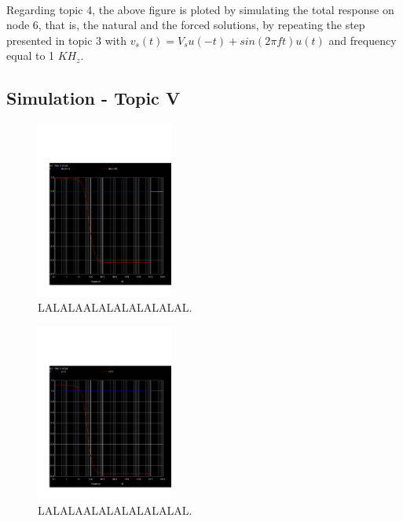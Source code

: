 \paragraph{}
Regarding topic 4, the above figure is ploted by simulating the total response on node 6, that is, the natural and the forced solutions, by repeating the step presented in topic 3 with $v_s(t) = V_s u(-t) + sin(2 \pi ft) u(t)$ and frequency equal to 1 $KH_z$. 


\subsection{Simulation - Topic V}
\label{subsec:sim_fifth}

\begin{figure}[H] \centering
\includegraphics[width=0.4\textwidth]{acm.pdf}
\caption{LALALAALALALALALALAL.}
\label{fig:LALALAAL}
\end{figure}


\begin{figure}[H] \centering
\includegraphics[width=0.4\textwidth]{acp.pdf}
\caption{LALALAALALALALALALAL.}
\label{fig:LALALAAL}
\end{figure}


\pagebreak
